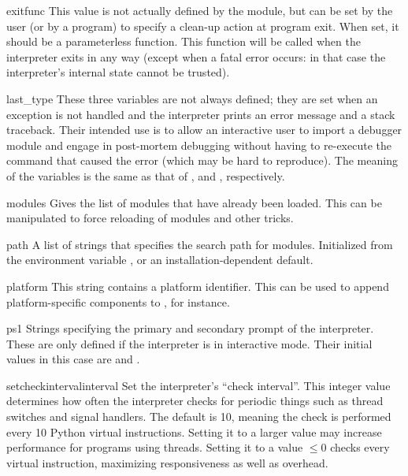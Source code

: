 \begin{datadesc}{exitfunc}
  This value is not actually defined by the module, but can be set by
  the user (or by a program) to specify a clean-up action at program
  exit.  When set, it should be a parameterless function.  This function
  will be called when the interpreter exits in any way (except when a
  fatal error occurs: in that case the interpreter's internal state
  cannot be trusted).
\end{datadesc}

\begin{datadesc}{last_type}
  These three variables are not always defined; they are set when an
  exception is not handled and the interpreter prints an error message
  and a stack traceback.  Their intended use is to allow an interactive
  user to import a debugger module and engage in post-mortem debugging
  without having to re-execute the command that caused the error (which
  may be hard to reproduce).  The meaning of the variables is the same
  as that of ,  and ,
  respectively.
\end{datadesc}

\begin{datadesc}{modules}
  Gives the list of modules that have already been loaded.
  This can be manipulated to force reloading of modules and other tricks.
\end{datadesc}

\begin{datadesc}{path}
  A list of strings that specifies the search path for modules.
  Initialized from the environment variable , or an
  installation-dependent default.
\end{datadesc}

\begin{datadesc}{platform}
This string contains a platform identifier.  This can be used to
append platform-specific components to , for instance.
\end{datadesc}

\begin{datadesc}{ps1}
  Strings specifying the primary and secondary prompt of the
  interpreter.  These are only defined if the interpreter is in
  interactive mode.  Their initial values in this case are
   and .
\end{datadesc}

\begin{funcdesc}{setcheckinterval}{interval}
Set the interpreter's ``check interval''.  This integer value
determines how often the interpreter checks for periodic things such
as thread switches and signal handlers.  The default is 10, meaning
the check is performed every 10 Python virtual instructions.  Setting
it to a larger value may increase performance for programs using
threads.  Setting it to a value $\leq 0$ checks every virtual instruction,
maximizing responsiveness as well as overhead.
\end{funcdesc}


